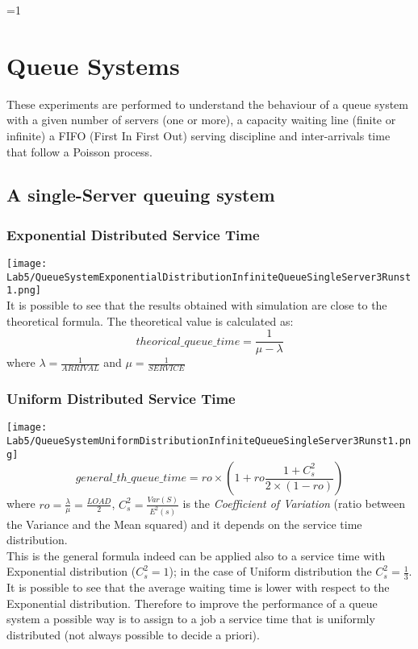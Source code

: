 \documentclass[twocolumn,letterpaper]{report}
\newcounter{debug}
\begin{document}
\twocolumn
\ifnum\value{debug}=1 {
    
\chapter{Queue Systems}
	These experiments are performed to understand the behaviour of a queue system with a given number of servers (one or more), a capacity waiting line (finite or infinite) a FIFO (First In First Out) serving discipline and inter-arrivals time that follow a Poisson process.
	
	 \section{A single-Server queuing system}
	 			\subsection{Exponential Distributed Service Time}
	 						\texttt{[image: Lab5/QueueSystemExponentialDistributionInfiniteQueueSingleServer3Runst1.png]} \\
								It is possible to see that the results obtained with simulation are close to the theoretical formula. 
			The theoretical value is calculated as:
			\begin{equation}
				theorical\_queue\_time = \frac{1}{ \mu - \lambda} 
			\end{equation}
				where $\lambda=\frac{1}{ARRIVAL}$ and $\mu=\frac{1}{SERVICE}$
			
	 			\subsection{Uniform Distributed Service Time}
	 			\texttt{[image: Lab5/QueueSystemUniformDistributionInfiniteQueueSingleServer3Runst1.png]} \\
	 			\begin{equation}
						general\_th\_queue\_time = ro \times ( 1 + ro \frac{1+C_s^2}{2\times(1-ro)} )
				\end{equation}
						where $ro=\frac{\lambda}{\mu}=\frac{LOAD}{2}$, $C_s^2=\frac{Var(S)}{E^2(s)}$ is the \emph{Coefficient of Variation} (ratio between the Variance and the Mean squared) and it depends on the service time distribution. \\
						This is the general formula indeed can be applied also to a service time with Exponential distribution ($C_s^2=1$); in the case of Uniform distribution the $C_s^2=\frac{1}{3}$. \\
						It is possible to see that the average waiting time is lower with respect to the Exponential distribution. Therefore to improve the performance of a queue system a possible way is to assign to a job a service time that is uniformly distributed (not always possible to decide a priori).
						
}
\end{document}
